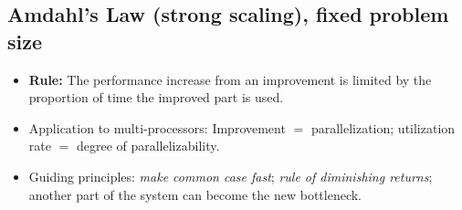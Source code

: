 \subsection{Amdahl's Law (strong scaling), fixed problem size}
\begin{itemize}
    \item \textbf{Rule:} The performance increase from an improvement is limited by the proportion of time the improved part is used.
    \item Application to multi-processors: Improvement $=$ parallelization; utilization rate $=$ degree of parallelizability.
    \item Guiding principles: \emph{make common case fast}; \emph{rule of diminishing returns}; another part of the system can become the new bottleneck.
\end{itemize}
\vspace*{-0.2cm}
